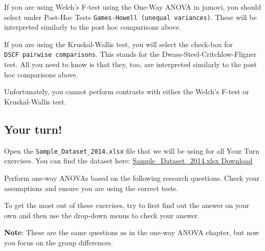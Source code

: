 \documentclass[
]{book}
\begin{document}
If you are using Welch's F-test using the One-Way ANOVA in jamovi, you should select under Post-Hoc Tests \texttt{Games-Howell\ (unequal\ variances)}. These will be interpreted similarly to the post hoc comparisons above.

If you are using the Kruskal-Wallis test, you will select the check-box for \texttt{DSCF\ pairwise\ comparisons}. This stands for the Dwass-Steel-Critchlow-Fligner test. All you need to know is that they, too, are interpreted similarly to the post hoc comparisons above.

Unfortunately, you cannot perform contrasts with either the Welch's F-test or Kruskal-Wallis test.

\hypertarget{your-turn-6}{%
\subsection{Your turn!}\label{your-turn-6}}

Open the \texttt{Sample\_Dataset\_2014.xlsx} file that we will be using for all Your Turn exercises. You can find the dataset here: \href{https://github.com/danawanzer/stats-with-jamovi/blob/master/data/Sample_Dataset_2014.xlsx}{Sample\_Dataset\_2014.xlsx Download}

Perform one-way ANOVAs based on the following research questions. Check your assumptions and ensure you are using the correct tests.

To get the most out of these exercises, try to first find out the answer on your own and then use the drop-down menus to check your answer.

\textbf{Note}: These are the same questions as in the one-way ANOVA chapter, but now you focus on the group differences.
\end{document}
